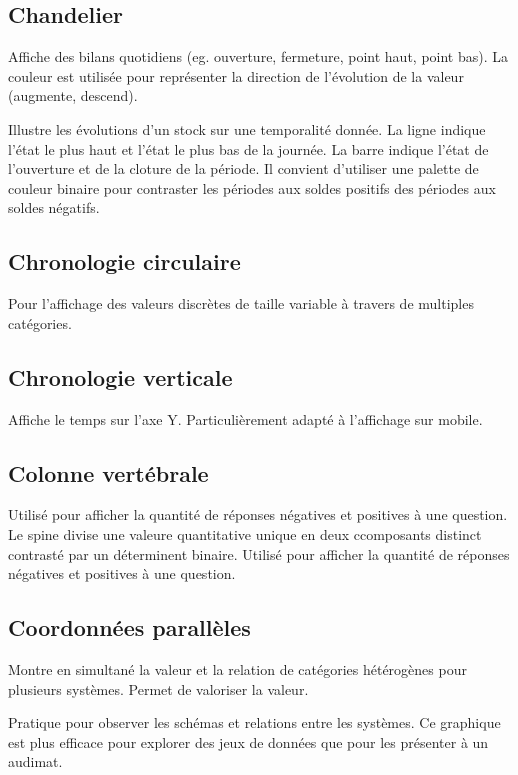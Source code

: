\documentclass[a4paper,12pt]{article}
\begin{document}
\begin{multicols}{2}
\subsection*{Chandelier}
\label{sec:orgc3e8b75}
Affiche des bilans quotidiens (eg. ouverture, fermeture, point haut, point bas). \autocite{alansmithLexiqueVisuel}
La couleur est utilisée pour représenter la direction de l'évolution de la valeur (augmente, descend).

Illustre les évolutions d'un stock sur une temporalité donnée. La ligne indique l'état le plus haut et l'état le plus bas de la journée. La barre indique l'état de l'ouverture et de la cloture de la période. \autocite{jonathanschwabishDistribution2021} Il convient d'utiliser une palette de couleur binaire pour contraster les périodes aux soldes positifs des périodes aux soldes négatifs.
\subsection*{Chronologie circulaire}
\label{sec:org579f246}
Pour l'affichage des valeurs discrètes de taille variable à travers de multiples catégories. \autocite{alansmithLexiqueVisuel}
\subsection*{Chronologie verticale}
\label{sec:orgd0b5c75}
Affiche le temps sur l'axe Y. Particulièrement adapté à l'affichage sur mobile. \autocite{alansmithLexiqueVisuel}
\subsection*{Colonne vertébrale}
\label{sec:org8747523}
Utilisé pour afficher la quantité de réponses négatives et positives à une question. Le spine divise une valeure quantitative unique en deux ccomposants distinct contrasté par un déterminent binaire. \autocite{alansmithLexiqueVisuel} Utilisé pour afficher la quantité de réponses négatives et positives à une question.
\subsection*{Coordonnées parallèles}
\label{sec:org7b77db5}
Montre en simultané la valeur et la relation de catégories hétérogènes pour plusieurs systèmes. \autocite{jonathanschwabishRelationship2021} Permet de valoriser la valeur. \autocite{alansmithLexiqueVisuel}

Pratique pour observer les schémas et relations entre les systèmes. \autocite{mikeyiHowChooseRight2020} Ce graphique est plus efficace pour explorer des jeux de données que pour les présenter à un audimat. \autocite{sosulskiGraphics2019}


\end{multicols}
\end{document}

